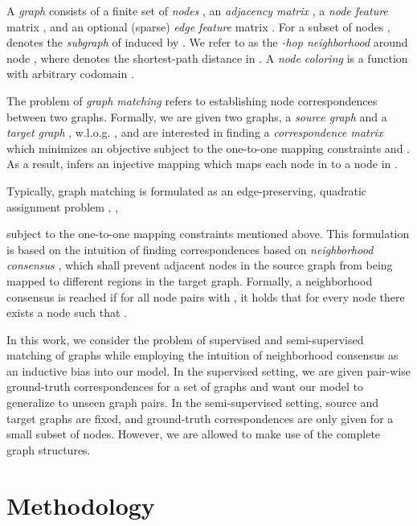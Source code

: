 \documentclass{article}
\begin{document}
A \emph{graph}  consists of a finite set of \emph{nodes} , an \emph{adjacency matrix} , a \emph{node feature} matrix , and an optional (sparse) \emph{edge feature} matrix  .
For a subset of nodes ,  denotes the \emph{subgraph} of  induced by .
We refer to  as the \emph{-hop neighborhood} around node , where  denotes the shortest-path distance in .
A \emph{node coloring} is a function  with arbitrary codomain .

The problem of \emph{graph matching} refers to establishing node correspondences between two graphs.
Formally, we are given two graphs, a \emph{source graph}  and a \emph{target graph} , w.l.o.g. , and are interested in finding a \emph{correspondence matrix}  which minimizes an objective subject to the one-to-one mapping constraints  and .
As a result,  infers an injective mapping  which maps each node in  to a node in .

Typically, graph matching is formulated as an edge-preserving, quadratic assignment problem \citep{Anstreicher/2003,Gold/Rangarajan/1996,Caetano/etal/2009,Cho/etal/2013}, \ie,

subject to the one-to-one mapping constraints mentioned above.
This formulation is based on the intuition of finding correspondences based on \emph{neighborhood consensus} \citep{Rocco/etal/2018}, which shall prevent adjacent nodes in the source graph from being mapped to different regions in the target graph.
Formally, a neighborhood consensus is reached if for all node pairs  with , it holds that for every node  there exists a node  such that .

In this work, we consider the problem of supervised and semi-supervised matching of graphs while employing the intuition of neighborhood consensus as an inductive bias into our model.
In the supervised setting, we are given pair-wise ground-truth correspondences for a set of graphs and want our model to generalize to unseen graph pairs.
In the semi-supervised setting, source and target graphs are fixed, and ground-truth correspondences are only given for a small subset of nodes.
However, we are allowed to make use of the complete graph structures.

\section{Methodology}\label{sec:methodology}
\end{document}
